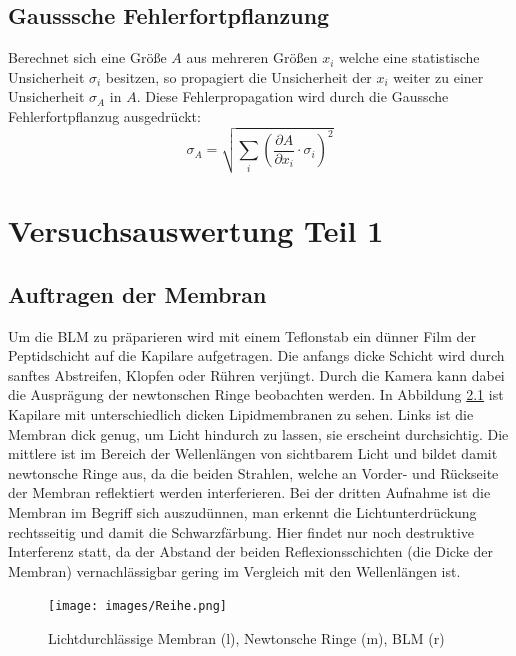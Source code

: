 \documentclass{include/thesisclass3}
\newcommand{\cc}{\cdot}
\newcommand{\p}{\partial}
\begin{document}
\section{Gausssche Fehlerfortpflanzung}
Berechnet sich eine Größe $A$ aus mehreren Größen $x_i$ welche eine statistische Unsicherheit $\sigma_i$ besitzen, so propagiert die Unsicherheit der $x_i$ weiter zu einer Unsicherheit $\sigma_A$ in $A$. Diese Fehlerpropagation wird durch die Gaussche Fehlerfortpflanzug ausgedrückt:
\begin{equation}
\sigma_A = \sqrt{\sum_i \left( \frac{\p A}{\p x_i} \cc \sigma_i \right)^2 }
\label{gauss}
\end{equation}



\chapter{Versuchsauswertung Teil 1}
\section{Auftragen der Membran}
Um die BLM zu präparieren wird mit einem Teflonstab ein dünner Film der Peptidschicht auf die Kapilare aufgetragen. Die anfangs dicke Schicht wird durch sanftes Abstreifen, Klopfen oder Rühren verjüngt. Durch die Kamera kann dabei die Ausprägung der newtonschen Ringe beobachten werden. In Abbildung \ref{Reihe} ist Kapilare mit unterschiedlich dicken Lipidmembranen zu sehen. Links ist die Membran dick genug, um Licht hindurch zu lassen, sie erscheint durchsichtig. Die mittlere ist im Bereich der Wellenlängen von sichtbarem Licht und bildet damit newtonsche Ringe aus, da die beiden Strahlen, welche an Vorder- und Rückseite der Membran reflektiert werden interferieren. Bei der dritten Aufnahme ist die Membran im Begriff sich auszudünnen, man erkennt die Lichtunterdrückung rechtsseitig und damit die Schwarzfärbung. Hier findet nur noch destruktive Interferenz statt, da der Abstand der beiden Reflexionsschichten (die Dicke der Membran) vernachlässigbar gering im Vergleich mit den Wellenlängen ist.
\begin{figure}[H]
	\begin{center}
		\texttt{[image: images/Reihe.png]}
		\caption{Lichtdurchlässige Membran (l), Newtonsche Ringe (m), BLM (r)}
		\label{Reihe}
	\end{center}
\end{figure}
\end{document}
